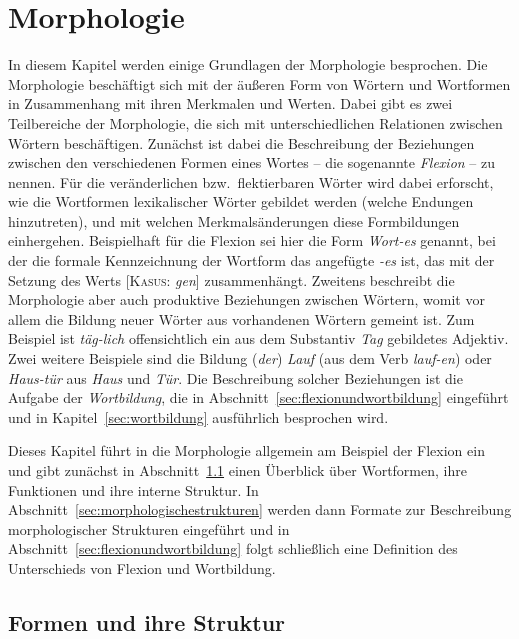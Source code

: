 \chapter{Morphologie}
\label{sec:morphologie}

In diesem Kapitel werden einige Grundlagen der Morphologie besprochen.
Die Morphologie beschäftigt sich mit der äußeren Form von Wörtern und Wortformen in Zusammenhang mit ihren Merkmalen und Werten.
Dabei gibt es zwei Teilbereiche der Morphologie, die sich mit unterschiedlichen Relationen zwischen Wörtern beschäftigen.
Zunächst ist dabei die Beschreibung der Beziehungen zwischen den verschiedenen Formen eines Wortes -- die sogenannte \textit{Flexion} -- zu nennen.
Für die veränderlichen bzw.\ flektierbaren Wörter wird dabei erforscht, wie die Wortformen lexikalischer Wörter gebildet werden (\zB welche Endungen hinzutreten), und mit welchen Merkmalsänderungen diese Formbildungen einhergehen.
Beispielhaft für die Flexion sei hier die Form \textit{Wort-es} genannt, bei der die formale Kennzeichnung der Wortform das angefügte \textit{-es} ist, das mit der Setzung des Werts [\textsc{Kasus}: \textit{gen}] zusammenhängt.
Zweitens beschreibt die Morphologie aber auch produktive Beziehungen zwischen Wörtern, womit vor allem die Bildung neuer Wörter aus vorhandenen Wörtern gemeint ist.
Zum Beispiel ist \textit{täg-lich} offensichtlich ein aus dem Substantiv \textit{Tag} gebildetes Adjektiv.
Zwei weitere Beispiele sind die Bildung (\textit{der}) \textit{Lauf} (aus dem Verb \textit{lauf-en}) oder \textit{Haus-tür} aus \textit{Haus} und \textit{Tür}.
Die Beschreibung solcher Beziehungen ist die Aufgabe der \textit{Wortbildung}, die in Abschnitt~\ref{sec:flexionundwortbildung} eingeführt und in Kapitel~\ref{sec:wortbildung} ausführlich besprochen wird.

Dieses Kapitel führt in die Morphologie allgemein am Beispiel der Flexion ein und gibt zunächst in Abschnitt~\ref{sec:formenundihrestruktur} einen Überblick über Wortformen, ihre Funktionen und ihre interne Struktur.
In Abschnitt~\ref{sec:morphologischestrukturen} werden dann Formate zur Beschreibung morphologischer Strukturen eingeführt und in Abschnitt~\ref{sec:flexionundwortbildung} folgt schließlich eine Definition des Unterschieds von Flexion und Wortbildung.

\section{Formen und ihre Struktur}
\label{sec:formenundihrestruktur}

